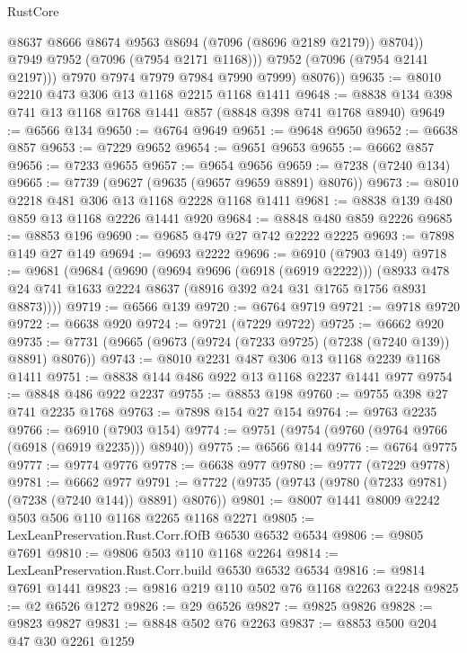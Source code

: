 \begin{lexlean}{RustCore}
\begin{coremodule}
                  @8637
                  @8666
                  @8674
                  @9563
                  @8694
                  (@7096 (@8696 @2189 @2179))
                  @8704))
              @7949
              @7952
              (@7096 (@7954 @2171 @1168)))
            @7952
            (@7096 (@7954 @2141 @2197)))
          @7970
          @7974
          @7979
          @7984
          @7990
          @7999)
        @8076))
@9635 := @8010 @2210 @473 @306 @13 @1168 @2215 @1168 @1411
@9648 := @8838 @134 @398 @741 @13 @1168 @1768 @1441 @857 (@8848 @398 @741 @1768 @8940)
@9649 := @6566 @134
@9650 := @6764 @9649
@9651 := @9648 @9650
@9652 := @6638 @857
@9653 := @7229 @9652
@9654 := @9651 @9653
@9655 := @6662 @857
@9656 := @7233 @9655
@9657 := @9654 @9656
@9659 := @7238 (@7240 @134)
@9665 := @7739 (@9627 (@9635 (@9657 @9659 @8891) @8076))
@9673 := @8010 @2218 @481 @306 @13 @1168 @2228 @1168 @1411
@9681 := @8838 @139 @480 @859 @13 @1168 @2226 @1441 @920
@9684 := @8848 @480 @859 @2226
@9685 := @8853 @196
@9690 := @9685 @479 @27 @742 @2222 @2225
@9693 := @7898 @149 @27 @149
@9694 := @9693 @2222
@9696 := @6910 (@7903 @149)
@9718 := @9681
    (@9684
      (@9690
        (@9694 @9696 (@6918 (@6919 @2222)))
        (@8933 @478 @24 @741 @1633 @2224 @8637 (@8916 @392 @24 @31 @1765 @1756 @8931 @8873))))
@9719 := @6566 @139
@9720 := @6764 @9719
@9721 := @9718 @9720
@9722 := @6638 @920
@9724 := @9721 (@7229 @9722)
@9725 := @6662 @920
@9735 := @7731 (@9665 (@9673 (@9724 (@7233 @9725) (@7238 (@7240 @139)) @8891) @8076))
@9743 := @8010 @2231 @487 @306 @13 @1168 @2239 @1168 @1411
@9751 := @8838 @144 @486 @922 @13 @1168 @2237 @1441 @977
@9754 := @8848 @486 @922 @2237
@9755 := @8853 @198
@9760 := @9755 @398 @27 @741 @2235 @1768
@9763 := @7898 @154 @27 @154
@9764 := @9763 @2235
@9766 := @6910 (@7903 @154)
@9774 := @9751 (@9754 (@9760 (@9764 @9766 (@6918 (@6919 @2235))) @8940))
@9775 := @6566 @144
@9776 := @6764 @9775
@9777 := @9774 @9776
@9778 := @6638 @977
@9780 := @9777 (@7229 @9778)
@9781 := @6662 @977
@9791 := @7722 (@9735 (@9743 (@9780 (@7233 @9781) (@7238 (@7240 @144)) @8891) @8076))
@9801 := @8007 @1441 @8009 @2242 @503 @506 @110 @1168 @2265 @1168 @2271
@9805 := LexLeanPreservation.Rust.Corr.fOfB @6530 @6532 @6534
@9806 := @9805 @7691
@9810 := @9806 @503 @110 @1168 @2264
@9814 := LexLeanPreservation.Rust.Corr.build @6530 @6532 @6534
@9816 := @9814 @7691 @1441
@9823 := @9816 @219 @110 @502 @76 @1168 @2263 @2248
@9825 := @2 @6526 @1272
@9826 := @29 @6526
@9827 := @9825 @9826
@9828 := @9823 @9827
@9831 := @8848 @502 @76 @2263
@9837 := @8853 @500 @204 @47 @30 @2261 @1259

\end{coremodule}
\end{lexlean}
